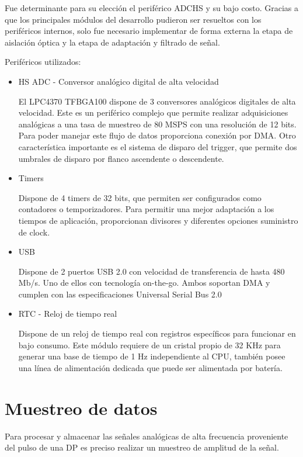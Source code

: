 Fue determinante para su elección el periférico ADCHS y su bajo costo. Gracias a que los principales módulos del desarrollo pudieron ser resueltos con los periféricos internos, solo fue necesario implementar de forma externa la etapa de aislación óptica y la etapa de adaptación y filtrado de señal.

Periféricos utilizados: 
\begin{itemize}

\item HS ADC - Conversor analógico digital de alta velocidad

El LPC4370 TFBGA100 dispone de 3 conversores analógicos digitales de alta velocidad. Este es un periférico complejo que permite realizar adquisiciones analógicas a una tasa de muestreo de 80 MSPS con una resolución de 12 bits. Para poder manejar este flujo de datos proporciona conexión por DMA. Otro característica importante es el sistema de disparo del trigger, que permite dos umbrales de disparo por flanco ascendente o descendente.

\item Timers

Dispone de 4 timers de 32 bits, que permiten ser configurados como contadores o temporizadores. Para permitir una mejor adaptación a los tiempos de aplicación, proporcionan divisores y diferentes opciones suministro de clock.


\item USB

Dispone de 2 puertos USB 2.0 con velocidad de transferencia de hasta 480 Mb/s. Uno de ellos con tecnología on-the-go. Ambos soportan DMA  y cumplen con las especificaciones Universal Serial Bus 2.0

\item RTC - Reloj de tiempo real

Dispone de un reloj de tiempo real con registros específicos para funcionar en bajo consumo. Este módulo requiere de un cristal propio de 32 KHz para generar una base de tiempo de 1 Hz independiente al CPU, también posee una línea de alimentación dedicada que puede ser alimentada por batería.
\end{itemize}


\section{Muestreo de datos}
Para procesar y almacenar las señales analógicas de alta frecuencia proveniente del pulso de una DP es preciso realizar un muestreo de amplitud de la señal. 

